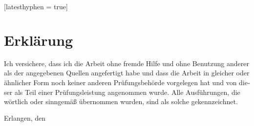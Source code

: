 
\cleardoublepage{}

\vspace*{\fill}
\begin{german}[latesthyphen = true]
	\section*{Erklärung}

	Ich versichere, dass ich die Arbeit ohne fremde Hilfe und ohne Benutzung anderer als der angegebenen Quellen
	angefertigt habe und dass die Arbeit in gleicher oder ähnlicher Form noch keiner anderen Prüfungsbehörde vorgelegen
	hat und von dieser als Teil einer Prüfungsleistung angenommen wurde. Alle Ausführungen, die wörtlich oder sinngemäß
	übernommen wurden, sind als solche gekennzeichnet.
	\vspace*{2cm}

	Erlangen, den 
	\hspace{1.3cm}
\end{german}
\vspace*{\fill}
